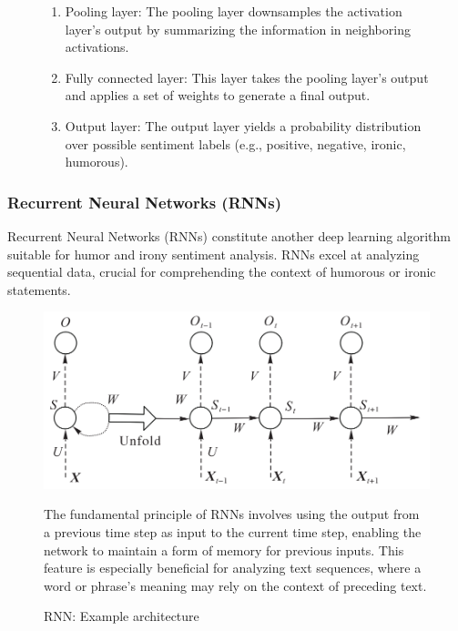 \documentclass[a4paper]{article}
\begin{document}
\begin{figure}[H]
\begin{minipage}{0.48\textwidth}
\begin{enumerate}
            \item Pooling layer: The pooling layer downsamples the activation layer's output by summarizing the information in neighboring activations.
            \item Fully connected layer: This layer takes the pooling layer's output and applies a set of weights to generate a final output.
            \item Output layer: The output layer yields a probability distribution over possible sentiment labels (e.g., positive, negative, ironic, humorous).
        \end{enumerate}
    \end{minipage}
\end{figure}


\subsubsection{Recurrent Neural Networks (RNNs)}

Recurrent Neural Networks (RNNs) constitute another deep learning algorithm suitable for humor and irony sentiment analysis. RNNs excel at analyzing sequential data, crucial for comprehending the context of humorous or ironic statements.

\begin{figure}[H]
    \centering
    \begin{minipage}{0.48\textwidth}
        \centering
        \includegraphics[width=1\textwidth]{./images/RNN_architecture.png}
        \caption{RNN: Example architecture \cite{ref_rnn1}}
        \label{fig.RNN}
    \end{minipage}\hfill
    \begin{minipage}{0.48\textwidth}
        The fundamental principle of RNNs involves using the output from a previous time step as input to the current time step, enabling the network to maintain a form of memory for previous inputs. This feature is especially beneficial for analyzing text sequences, where a word or phrase's meaning may rely on the context of preceding text.
    \end{minipage}
\end{figure}
\end{document}
